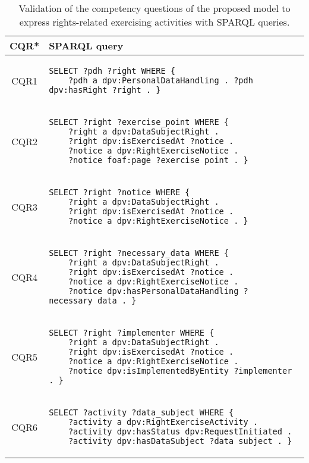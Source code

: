 \begin{table}[htp]
    \centering
    \caption{Validation of the competency questions of the proposed model to express rights-related exercising activities with SPARQL queries.}
    \label{tab:rights_cq_sparql}
    \footnotesize
    \begin{tabular}{c||l}
        \textbf{CQR*} & \textbf{SPARQL query} \\
        \hline\hline
        CQR1 & \begin{lstlisting}[numbers=none]
SELECT ?pdh ?right WHERE {
    ?pdh a dpv:PersonalDataHandling . ?pdh dpv:hasRight ?right . } \end{lstlisting} \\
        \hline
        CQR2 & \begin{lstlisting}[numbers=none]
SELECT ?right ?exercise_point WHERE {
    ?right a dpv:DataSubjectRight . 
    ?right dpv:isExercisedAt ?notice . 
    ?notice a dpv:RightExerciseNotice . 
    ?notice foaf:page ?exercise_point . } \end{lstlisting} \\
        \hline
        CQR3 & \begin{lstlisting}[numbers=none]
SELECT ?right ?notice WHERE {
    ?right a dpv:DataSubjectRight . 
    ?right dpv:isExercisedAt ?notice . 
    ?notice a dpv:RightExerciseNotice . } \end{lstlisting} \\
        \hline
        CQR4 & \begin{lstlisting}[numbers=none]
SELECT ?right ?necessary_data WHERE {
    ?right a dpv:DataSubjectRight . 
    ?right dpv:isExercisedAt ?notice . 
    ?notice a dpv:RightExerciseNotice .
    ?notice dpv:hasPersonalDataHandling ?necessary_data . } \end{lstlisting} \\
        \hline
        CQR5 & \begin{lstlisting}[numbers=none]
SELECT ?right ?implementer WHERE {
    ?right a dpv:DataSubjectRight . 
    ?right dpv:isExercisedAt ?notice . 
    ?notice a dpv:RightExerciseNotice .
    ?notice dpv:isImplementedByEntity ?implementer . } \end{lstlisting} \\
        \hline
        CQR6 & \begin{lstlisting}[numbers=none]
SELECT ?activity ?data_subject WHERE {
    ?activity a dpv:RightExerciseActivity .
    ?activity dpv:hasStatus dpv:RequestInitiated . 
    ?activity dpv:hasDataSubject ?data_subject . } \end{lstlisting} \\

\end{tabular}
\end{table}
